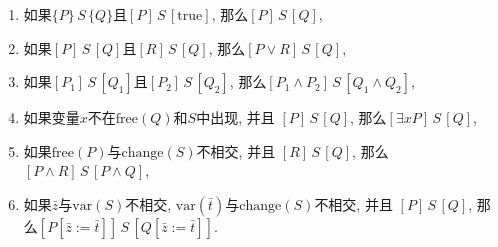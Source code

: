 \documentclass[UTF8]{ctexart}
\begin{document}
\begin{enumerate}
    \item 如果$\{P\}\,S\,\{Q\}$且$[P]\,S\,[\mathrm{true}]$, 那么$[P]\,S\,[Q]$,
    \item 如果$[P]\,S\,[Q]$且$[R]\,S\,[Q]$,
    那么$[P\lor R]\,S\,[Q]$,
    \item 如果$[P_1]\,S\,[Q_1]$且$[P_2]\,S\,[Q_2]$,
    那么$[P_1\land P_2]\,S\,[Q_1\land Q_2]$,
    \item 如果变量$x$不在$\mathrm{free}(Q)$和$S$中出现, 并且
    $[P]\,S\,[Q]$, 那么$[\exists xP]\,S\,[Q]$,
    \item 如果$\mathrm{free}(P)$与$\mathrm{change}(S)$不相交, 并且
    $[R]\,S\,[Q]$, 那么$[P\land R]\,S\,[P\land Q]$,
    \item 如果$\bar{z}$与$\mathrm{var}(S)$不相交,
    $\mathrm{var}(\bar{t})$与$\mathrm{change}(S)$不相交, 并且
    $[P]\,S\,[Q]$, 那么$[P[\bar{z}:=\bar{t}]]\,S\,[Q[\bar{z}:=\bar{t}]]$.
\end{enumerate}
\end{document}
